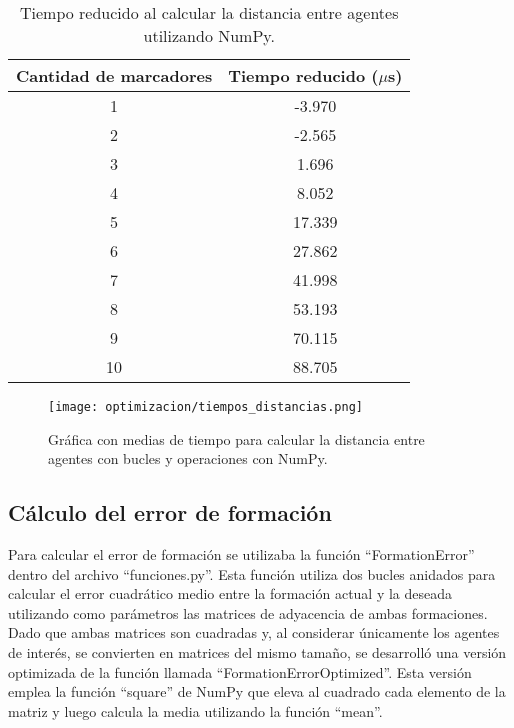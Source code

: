 \begin{table}[H]
	\centering
	\resizebox{0.5\textwidth}{!} {
	\begin{tabular}{|c|c|}
		\hline
		\textbf{Cantidad de marcadores} & \textbf{Tiempo reducido ($\mu$s)} \\ \hline
		1                               & -3.970                        \\ \hline
		2                               & -2.565                        \\ \hline
		3                               & 1.696                         \\ \hline
		4                               & 8.052                         \\ \hline
		5                               & 17.339                        \\ \hline
		6                               & 27.862                        \\ \hline
		7                               & 41.998                        \\ \hline
		8                               & 53.193                        \\ \hline
		9                               & 70.115                        \\ \hline
		10                              & 88.705                        \\ \hline
	\end{tabular}}
	\caption{Tiempo reducido al calcular la distancia entre agentes utilizando NumPy.}
	\label{cuadro:tiempo_reducido_distancia}
\end{table}

\begin{figure}[H]
	\centering
	\texttt{[image: optimizacion/tiempos\_distancias.png]}
	\caption{Gráfica con medias de tiempo para calcular la distancia entre agentes con bucles y operaciones con NumPy.}
	\label{fig:grafica_tiempos_distancias}
\end{figure}

\subsection{Cálculo del error de formación}
Para calcular el error de formación se utilizaba la función ``FormationError'' dentro del archivo ``funciones.py''. Esta función utiliza dos bucles anidados para calcular el error cuadrático medio entre la formación actual y la deseada utilizando como parámetros las matrices de adyacencia de ambas formaciones. Dado que ambas matrices son cuadradas y, al considerar únicamente los agentes de interés, se convierten en matrices del mismo tamaño, se desarrolló una versión optimizada de la función llamada ``FormationErrorOptimized''. Esta versión emplea la función ``square'' de NumPy que eleva al cuadrado cada elemento de la matriz y luego calcula la media utilizando la función ``mean''.

